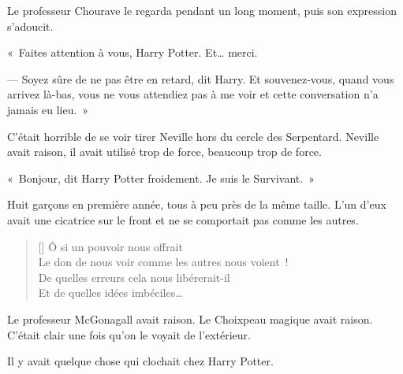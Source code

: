 Le professeur Chourave le regarda pendant un long moment, puis son expression s'adoucit.

«~Faites attention à vous, Harry Potter. Et… merci.

--- Soyez sûre de ne pas être en retard, dit Harry. Et souvenez-vous, quand vous arrivez là-bas, vous ne vous attendiez pas à me voir et cette conversation n'a jamais eu lieu.~»

\later

C'était horrible de se voir tirer Neville hors du cercle des Serpentard. Neville avait raison, il avait utilisé trop de force, beaucoup trop de force.

«~Bonjour, dit Harry Potter froidement. Je suis le Survivant.~»

Huit garçons en première année, tous à peu près de la même taille. L'un d'eux avait une cicatrice sur le front et ne se comportait pas comme les autres.

\baselineskip\settowidth{\versewidth}{Le don de nous voir comme les autres nous voient~!} \begin{verse}[\versewidth] Ô si un pouvoir nous offrait\\ Le don de nous voir comme les autres nous voient~!\\ De quelles erreurs cela nous libérerait-il\\ Et de quelles idées imbéciles… \end{verse}

Le professeur McGonagall avait raison. Le Choixpeau magique avait raison. C'était clair une fois qu'on le voyait de l'extérieur.

Il y avait quelque chose qui clochait chez Harry Potter.~
